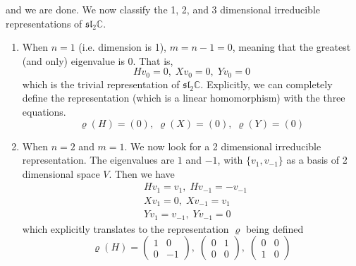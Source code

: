 \documentclass{article}
\begin{document}
    and we are done. We now classify the 1, 2, and 3 dimensional irreducible representations of $\mathfrak{sl}_2 \mathbb{C}$. 
    \begin{enumerate}
      \item When $n = 1$ (i.e. dimension is 1), $m = n-1 = 0$, meaning that the greatest (and only) eigenvalue is $0$. That is, 
        \begin{equation}
          H v_0 = 0,\; X v_0 = 0,\; Y v_0 = 0
        \end{equation}
      which is the trivial representation of $\mathfrak{sl}_2 \mathbb{C}$. Explicitly, we can completely define the representation (which is a linear homomorphism) with the three equations. 
      \begin{equation}
        \varrho(H) = (0),\; \varrho(X) = (0),\; \varrho(Y) = (0)
      \end{equation}

      \item When $n = 2$ and $m=1$. We now look for a 2 dimensional irreducible representation. The eigenvalues are $1$ and $-1$, with $\{v_1, v_{-1}\}$ as a basis of 2 dimensional space $V$. Then we have 
        \begin{align*}
          & Hv_1 = v_1, \; Hv_{-1} = - v_{-1} \\
          & X v_1 = 0, \; X v_{-1} = v_1 \\
          & Y v_1 = v_{-1}, \; Y v_{-1} = 0
        \end{align*}
      which explicitly translates to the representation $\varrho$ being defined
      \begin{equation}
        \varrho(H) = \begin{pmatrix}
        1&0\\0&-1
        \end{pmatrix}, \; \begin{pmatrix}
        0&1\\0&0
        \end{pmatrix}, \; \begin{pmatrix}
        0&0\\1&0
        \end{pmatrix}
      \end{equation}


\end{enumerate}
\end{document}
